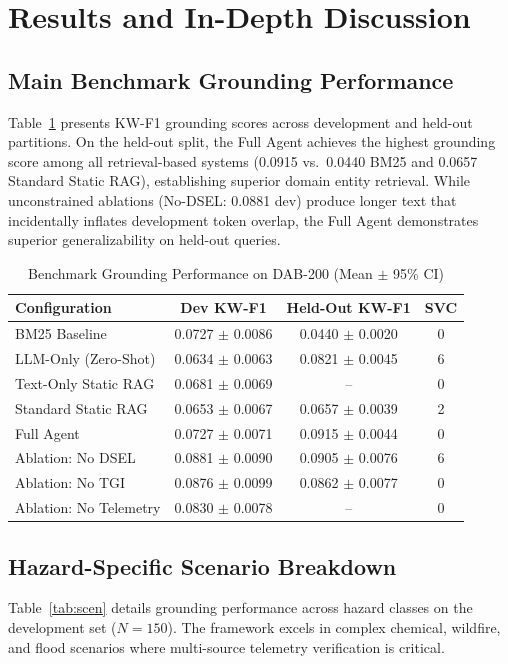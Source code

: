 \documentclass[conference]{IEEEtran}
\begin{document}
\section{Results and In-Depth Discussion}

\subsection{Main Benchmark Grounding Performance}
Table~\ref{tab:main} presents KW-F1 grounding scores across development and held-out partitions. On the held-out split, the Full Agent achieves the highest grounding score among all retrieval-based systems (0.0915 vs.\ 0.0440 BM25 and 0.0657 Standard Static RAG), establishing superior domain entity retrieval. While unconstrained ablations (No-DSEL: 0.0881 dev) produce longer text that incidentally inflates development token overlap, the Full Agent demonstrates superior generalizability on held-out queries.

\begin{table}[!t]
\caption{Benchmark Grounding Performance on DAB-200 (Mean $\pm$ 95\% CI)}
\label{tab:main}
\centering
\footnotesize
\setlength{\tabcolsep}{3pt}
\begin{tabular*}{\columnwidth}{@{\extracolsep{\fill}}lccc@{}}
\toprule
Configuration & Dev KW-F1 & Held-Out KW-F1 & SVC \\
\midrule
BM25 Baseline & 0.0727 $\pm$ 0.0086 & 0.0440 $\pm$ 0.0020 & 0 \\
LLM-Only (Zero-Shot) & 0.0634 $\pm$ 0.0063 & 0.0821 $\pm$ 0.0045 & 6 \\
Text-Only Static RAG & 0.0681 $\pm$ 0.0069 & -- & 0 \\
Standard Static RAG & 0.0653 $\pm$ 0.0067 & 0.0657 $\pm$ 0.0039 & 2 \\
Full Agent & 0.0727 $\pm$ 0.0071 & 0.0915 $\pm$ 0.0044 & 0 \\
\midrule
Ablation: No DSEL & 0.0881 $\pm$ 0.0090 & 0.0905 $\pm$ 0.0076 & 6 \\
Ablation: No TGI & 0.0876 $\pm$ 0.0099 & 0.0862 $\pm$ 0.0077 & 0 \\
Ablation: No Telemetry & 0.0830 $\pm$ 0.0078 & -- & 0 \\
\bottomrule
\end{tabular*}
\end{table}

\subsection{Hazard-Specific Scenario Breakdown}
Table~\ref{tab:scen} details grounding performance across hazard classes on the development set ($N = 150$). The framework excels in complex chemical, wildfire, and flood scenarios where multi-source telemetry verification is critical.
\end{document}
